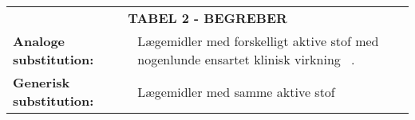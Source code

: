 \begin{table}[H]
\label{table:begreber}
\begin{tabular}{p{4.5cm} p{9.8cm}}
\multicolumn{2}{c}{\cellcolor[HTML]{C0C0C0}\textbf{TABEL 2 - BEGREBER}} \vspace{0.5cm}\\
\textbf{Analoge substitution:} & Lægemidler med forskelligt aktive stof med nogenlunde ensartet klinisk virkning~\citep{DanskSelskabforPatientsikkerhed2009} . \vspace{0.5cm} \\
\textbf{Generisk substitution:} & Lægemidler med samme aktive stof \vspace{0.5cm} \\

\end{tabular}
\end{table}
